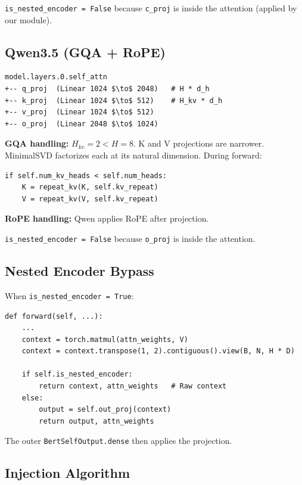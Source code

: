 \texttt{is\_nested\_encoder = False} because \texttt{c\_proj} is inside the attention (applied 
by our module).

\subsection{Qwen3.5 (GQA + RoPE)}

\begin{lstlisting}
model.layers.0.self_attn
+-- q_proj  (Linear 1024 $\to$ 2048)   # H * d_h
+-- k_proj  (Linear 1024 $\to$ 512)    # H_kv * d_h
+-- v_proj  (Linear 1024 $\to$ 512)
+-- o_proj  (Linear 2048 $\to$ 1024)
\end{lstlisting}

\textbf{GQA handling:} $H_{kv} = 2 < H = 8$. K and V projections are narrower. 
MinimalSVD factorizes each at its natural dimension. During forward:

\begin{lstlisting}
if self.num_kv_heads < self.num_heads:
    K = repeat_kv(K, self.kv_repeat)
    V = repeat_kv(V, self.kv_repeat)
\end{lstlisting}

\textbf{RoPE handling:} Qwen applies RoPE after projection.

\texttt{is\_nested\_encoder = False} because \texttt{o\_proj} is inside the attention.

\subsection{Nested Encoder Bypass}

When \texttt{is\_nested\_encoder = True}:

\begin{lstlisting}
def forward(self, ...):
    ...
    context = torch.matmul(attn_weights, V)
    context = context.transpose(1, 2).contiguous().view(B, N, H * D)
    
    if self.is_nested_encoder:
        return context, attn_weights   # Raw context
    else:
        output = self.out_proj(context)
        return output, attn_weights
\end{lstlisting}

The outer \texttt{BertSelfOutput.dense} then applies the projection.

\subsection{Injection Algorithm}

